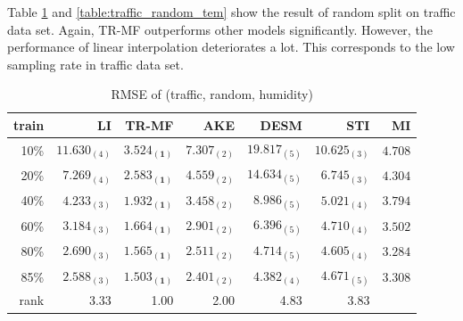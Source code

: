 Table \ref{table:traffic_random_hum} and \ref{table:traffic_random_tem} show the result of random split on traffic data set. Again, TR-MF outperforms other models significantly. However, the performance of linear interpolation deteriorates a lot. This corresponds to the low sampling rate in traffic data set. 

\begin{table} [htbp]
\setlength{\tabcolsep}{2pt}
\centering
\caption{RMSE of (traffic, random, humidity)}
\label{table:traffic_random_hum}
\begin{tabular}{ r | r r r r r r}
	train	&LI	&TR-MF	&AKE	&DESM	&STI &MI\\ \hline
	10\% & $ 11.630_{(4)} $ & $ \mathbf{ 3.524_{(1)} } $ & $ 7.307_{(2)} $ & $ 19.817_{(5)} $ & $ 10.625_{(3)} $ & $4.708$  \\
	20\% & $ 7.269_{(4)} $ & $ \mathbf{ 2.583_{(1)} } $ & $ 4.559_{(2)} $ & $ 14.634_{(5)} $ & $ 6.745_{(3)}  $    & $4.304$\\
	40\% & $ 4.233_{(3)} $ & $ \mathbf{ 1.932_{(1)} } $ & $ 3.458_{(2)} $ & $ 8.986_{(5)} $ & $ 5.021_{(4)} $       & $3.794$\\
	60\% & $ 3.184_{(3)} $ & $ \mathbf{ 1.664_{(1)} } $ & $ 2.901_{(2)} $ & $ 6.396_{(5)} $ & $ 4.710_{(4)} $       & $3.502$\\
	80\% & $ 2.690_{(3)} $ & $ \mathbf{ 1.565_{(1)} } $ & $ 2.511_{(2)} $ & $ 4.714_{(5)} $ & $ 4.605_{(4)} $       &$3.284$\\
	85\% & $ 2.588_{(3)} $ & $ \mathbf{ 1.503_{(1)} } $ & $ 2.401_{(2)} $ & $ 4.382_{(4)} $ & $ 4.671_{(5)} $       & $3.308$\\ \hline
	rank &3.33 &1.00 &2.00 &4.83 &3.83 \\
\end{tabular}
\end{table}

